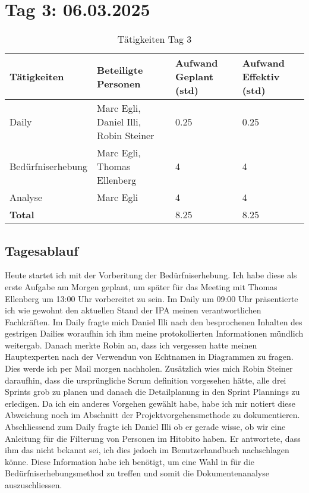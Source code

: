 \section{Tag 3: 06.03.2025}
\begin{table}[H]
    \begin{tabular}{|L{0.4\textwidth}|C{60pt}|C{60pt}|C{60pt}|}
        \hline
        \color{white}Tätigkeiten & \color{white}Beteiligte \color{white}Personen & \color{white}Aufwand Geplant (std) & \color{white}Aufwand Effektiv (std) \\
        \hline
        Daily & Marc Egli, Daniel Illi, Robin Steiner & 0.25 & 0.25 \\
        \hline
        Bedürfniserhebung & Marc Egli, Thomas Ellenberg & 4 & 4 \\
        \hline
        Analyse & Marc Egli & 4 & 4 \\
        \hline
        \textbf{Total} &   & 8.25 & 8.25 \\
        \hline
    \end{tabular}
    \caption{Tätigkeiten Tag 3}
\end{table}

\subsection*{Tagesablauf}
Heute startet ich mit der Vorberitung der Bedürfniserhebung. Ich habe diese als erste Aufgabe am Morgen geplant,
um später für das Meeting mit Thomas Ellenberg um 13:00 Uhr vorbereitet zu sein. Im Daily um 09:00 Uhr präsentierte ich wie gewohnt den 
aktuellen Stand der IPA meinen verantwortlichen Fachkräften. Im Daily fragte mich Daniel Illi nach den besprochenen Inhalten des gestrigen Dailies
woraufhin ich ihm meine protokollierten Informationen mündlich weitergab. Danach merkte Robin an, dass ich vergessen hatte meinen Hauptexperten nach der 
Verwendun von Echtnamen in Diagrammen zu fragen. Dies werde ich per Mail morgen nachholen. Zusätzlich wies mich Robin Steiner daraufhin, dass die ursprüngliche
Scrum definition vorgesehen hätte, alle drei Sprints grob zu planen und danach die Detailplanung in den Sprint Plannings zu erledigen. Da ich ein anderes Vorgehen gewählt
habe, habe ich mir notiert diese Abweichung noch im Abschnitt der Projektvorgehensmethode zu dokumentieren. Abschliessend zum Daily fragte ich Daniel Illi ob er gerade
wisse, ob wir eine Anleitung für die Filterung von Personen im Hitobito haben. Er antwortete, dass ihm das nicht bekannt sei, ich dies jedoch im Benutzerhandbuch nachschlagen
könne. Diese Information habe ich benötigt, um eine Wahl in für die Bedürfniserhebungsmethod zu treffen und somit die Dokumentenanalyse
auszuschliessen.

